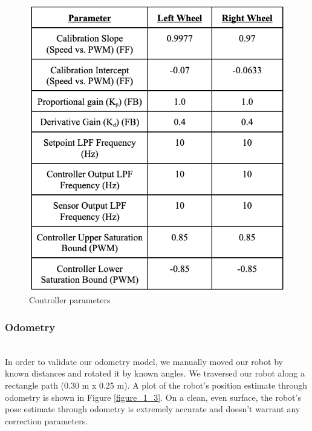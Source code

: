 \documentclass[journal]{IEEEtran}
\begin{document}
\begin{figure}[h]
\begin{center}
\includegraphics[width=0.82\linewidth]{image_1/Table_1_2_1.jpg}
\end{center}
    \caption{Controller parameters}
	\label{Table_1_2_1}
\end{figure}


\subsubsection{Odometry} \hfill\\

In order to validate our odometry model, we manually moved our robot by known distances and rotated it by known angles. We traversed our robot along a rectangle path (0.30 m x 0.25 m). A plot of the robot’s position estimate through odometry is shown in Figure \ref{figure_1_3}. On a clean, even surface, the robot’s pose estimate through odometry is extremely accurate and doesn’t warrant any correction parameters.\\
\end{document}
